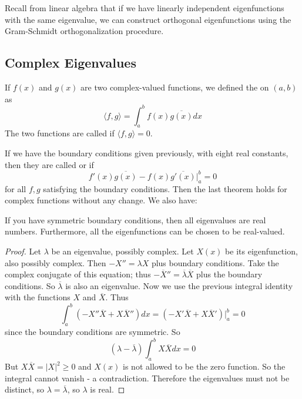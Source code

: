 \documentclass[12pt, a4paper, oneside, openright, titlepage]{book}
\begin{document}
Recall from linear algebra that if we have linearly independent eigenfunctions with the same eigenvalue, we can construct orthogonal eigenfunctions using the Gram-Schmidt orthogonalization procedure. 

\subsection{Complex Eigenvalues}

\begin{defn}
    If $f(x)$ and $g(x)$ are two complex-valued functions, we defined the  on $(a,b)$ as \begin{equation}
        \boxed{\langle f,g\rangle = \int_a^bf(x)\overline{g(x)}dx}
    \end{equation}
    The two functions are called  if $\langle f,g\rangle = 0$.
\end{defn}

If we have the boundary conditions given previously, with eight real constants, then they are called  or  if \begin{equation}
    \boxed{f'(x)\overline{g(x)}-f(x)\overline{g'(x)}\Bigg\rvert_a^b=0}
\end{equation}
for all $f,g$ satisfying the boundary conditions. Then the last theorem holds for complex functions without any change. We also have:

\begin{thm}
    If you have symmetric boundary conditions, then all eigenvalues are real numbers. Furthermore, all the eigenfunctions can be chosen to be real-valued.
\end{thm}
\begin{proof}
    Let $\lambda$ be an eigenvalue, possibly complex. Let $X(x)$ be its eigenfunction, also possibly complex. Then $-X'' = \lambda X$ plus boundary conditions. Take the complex conjugate of this equation; thus $-\overline{X}'' = \overline{\lambda}\overline{X}$ plus the boundary conditions. So $\overline{\lambda}$ is also an eigenvalue. Now we use the previous integral identity with the functions $X$ and $\overline{X}$. Thus \begin{equation*}
        \int_a^b(-X''\overline{X}+X\overline{X}'')dx = (-X'\overline{X}+X\overline{X}')\Bigg\rvert_a^b = 0
    \end{equation*}
    since the boundary conditions are symmetric. So \begin{equation*}
        (\lambda - \overline{\lambda})\int_a^bX\overline{X}dx = 0
    \end{equation*}
    But $X\overline{X}=|X|^2 \geq 0$ and $X(x)$ is not allowed to be the zero function. So the integral cannot vanish - a contradiction. Therefore the eigenvalues must not be distinct, so $\lambda = \overline{\lambda}$, so $\lambda$ is real.
\end{proof}
\end{document}
